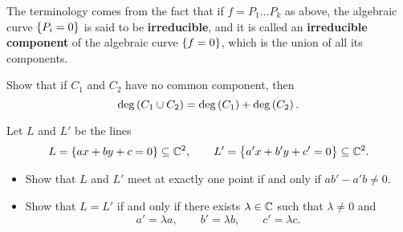 \begin{remark}
The terminology comes from the fact that if $ f = P_1 \dots P_k $ as above, the algebraic curve $ \cbr{P_i = 0} $ is said to be \textbf{irreducible}, and it is called an \textbf{irreducible component} of the algebraic curve $ \cbr{f = 0} $, which is the union of all its components.
\end{remark}

\begin{exercise}
Show that if $ C_1 $ and $ C_2 $ have no common component, then
$$ \deg\br{C_1 \cup C_2} = \deg\br{C_1} + \deg\br{C_2}. $$
\end{exercise}

\begin{exercise}
Let $ L $ and $ L' $ be the lines
$$ L = \cbr{ax + by + c = 0} \subseteq \C^2, \qquad L' = \cbr{a'x + b'y + c' = 0} \subseteq \C^2. $$
\begin{itemize}
\item Show that $ L $ and $ L' $ meet at exactly one point if and only if $ ab' - a'b \ne 0 $.
\item Show that $ L = L' $ if and only if there exists $ \lambda \in \mathbb{C} $ such that $ \lambda \ne 0 $ and
$$ a' = \lambda a, \qquad b' = \lambda b, \qquad c' = \lambda c. $$
\end{itemize}
\end{exercise}

\pagebreak

